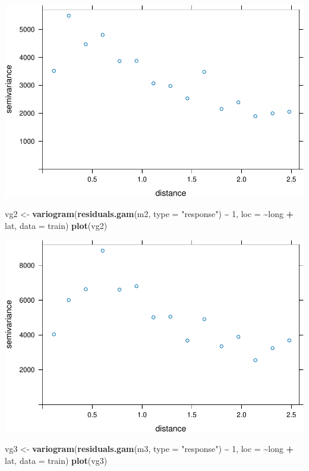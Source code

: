 \documentclass[
]{book}
\newenvironment{Shaded}{\begin{snugshade}}{\end{snugshade}}
\newcommand{\AttributeTok}[1]{\textcolor[rgb]{0.13,0.29,0.53}{#1}}
\newcommand{\DecValTok}[1]{\textcolor[rgb]{0.00,0.00,0.81}{#1}}
\newcommand{\FunctionTok}[1]{\textcolor[rgb]{0.13,0.29,0.53}{\textbf{#1}}}
\newcommand{\NormalTok}[1]{#1}
\newcommand{\OtherTok}[1]{\textcolor[rgb]{0.56,0.35,0.01}{#1}}
\newcommand{\SpecialCharTok}[1]{\textcolor[rgb]{0.81,0.36,0.00}{\textbf{#1}}}
\newcommand{\StringTok}[1]{\textcolor[rgb]{0.31,0.60,0.02}{#1}}
\begin{document}
\includegraphics{_main_files/figure-latex/unnamed-chunk-35-1.pdf}

\begin{Shaded}
\begin{Highlighting}[]
\NormalTok{vg2 }\OtherTok{\textless{}{-}} \FunctionTok{variogram}\NormalTok{(}\FunctionTok{residuals.gam}\NormalTok{(m2, }\AttributeTok{type =} \StringTok{"response"}\NormalTok{) }\SpecialCharTok{\textasciitilde{}} \DecValTok{1}\NormalTok{, }\AttributeTok{loc =} \SpecialCharTok{\textasciitilde{}}\NormalTok{long }\SpecialCharTok{+}
\NormalTok{                  lat, }\AttributeTok{data =}\NormalTok{ train)}
\FunctionTok{plot}\NormalTok{(vg2)}
\end{Highlighting}
\end{Shaded}

\includegraphics{_main_files/figure-latex/unnamed-chunk-35-2.pdf}

\begin{Shaded}
\begin{Highlighting}[]
\NormalTok{vg3 }\OtherTok{\textless{}{-}} \FunctionTok{variogram}\NormalTok{(}\FunctionTok{residuals.gam}\NormalTok{(m3, }\AttributeTok{type =} \StringTok{"response"}\NormalTok{) }\SpecialCharTok{\textasciitilde{}} \DecValTok{1}\NormalTok{, }\AttributeTok{loc =} \SpecialCharTok{\textasciitilde{}}\NormalTok{long }\SpecialCharTok{+}
\NormalTok{                  lat, }\AttributeTok{data =}\NormalTok{ train)}
\FunctionTok{plot}\NormalTok{(vg3)}
\end{Highlighting}
\end{Shaded}
\end{document}
